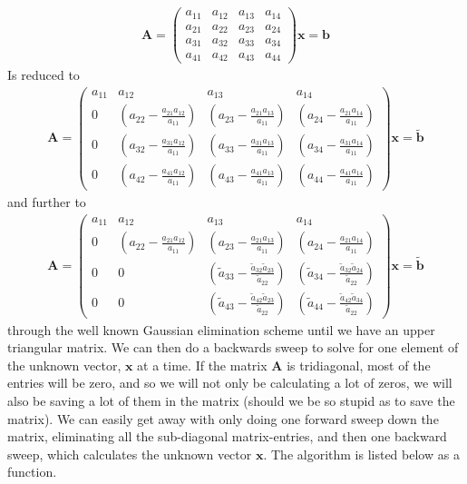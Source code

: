 \begin{align}
  \mathbf{A} = 
 \left( \begin{array}{rrrr}
 a_{11} & a_{12} & a_{13} & a_{14} \\
 a_{21} & a_{22} & a_{23} & a_{24} \\
 a_{31} & a_{32} & a_{33} & a_{34} \\
 a_{41} & a_{42} & a_{43} & a_{44}
 \end{array} \right)\mathbf{x} = \mathbf{b}
\end{align}
Is reduced to
\begin{align}
  \mathbf{A} = 
 \left( \begin{array}{rrrr}
 a_{11} & a_{12} & a_{13} & a_{14} \\
 0 & (a_{22}-\frac{a_{21}a_{12}}{a_{11}}) & (a_{23}-\frac{a_{21}a_{13}}{a_{11}}) & (a_{24}-\frac{a_{21}a_{14}}{a_{11}}) \\
 0 & (a_{32}-\frac{a_{31}a_{12}}{a_{11}}) & (a_{33}-\frac{a_{31}a_{13}}{a_{11}}) & (a_{34}-\frac{a_{31}a_{14}}{a_{11}}) \\
 0 & (a_{42}-\frac{a_{41}a_{12}}{a_{11}}) & (a_{43}-\frac{a_{41}a_{13}}{a_{11}}) & (a_{44}-\frac{a_{41}a_{14}}{a_{11}})
 \end{array} \right)\mathbf{x} = \tilde{\mathbf{b}}
\end{align}
and further to
\begin{align}
  \mathbf{A} = 
 \left( \begin{array}{rrrr}
 a_{11} & a_{12} & a_{13} & a_{14} \\
 0 & (a_{22}-\frac{a_{21}a_{12}}{a_{11}}) & (a_{23}-\frac{a_{21}a_{13}}{a_{11}}) & (a_{24}-\frac{a_{21}a_{14}}{a_{11}}) \\
 0 & 0 & (\tilde{a}_{33}-\frac{\tilde{a}_{32}\tilde{a}_{23}}{\tilde{a}_{22}}) & (\tilde{a}_{34}-\frac{\tilde{a}_{32}\tilde{a}_{24}}{\tilde{a}_{22}}) \\
 0 & 0 & (\tilde{a}_{43}-\frac{\tilde{a}_{42}\tilde{a}_{23}}{\tilde{a}_{22}}) & (\tilde{a}_{44}-\frac{\tilde{a}_{42}\tilde{a}_{34}}{\tilde{a}_{22}})
 \end{array} \right)\mathbf{x} = \tilde{\mathbf{b}}
\end{align}
through the well known Gaussian elimination scheme until we have an upper triangular matrix. We can then do a backwards sweep to solve for one element of the unknown vector, $\mathbf{x}$ at a time. If the matrix $\mathbf{A}$ is tridiagonal, most of the entries will be zero, and so we will not only be calculating a lot of zeros, we will also be saving a lot of them in the matrix (should we be so stupid as to save the matrix). We can easily get away with only doing one forward sweep down the matrix, eliminating all the sub-diagonal matrix-entries, and then one backward sweep, which calculates the unknown vector $\mathbf{x}$. The algorithm is listed below as a function.


